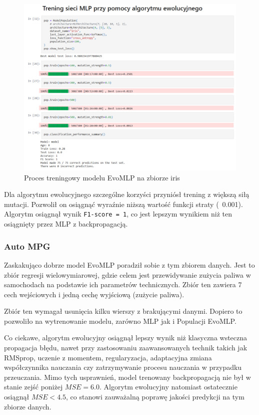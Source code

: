 \documentclass{article}
\begin{document}
\begin{figure}[H]
    \centering
    \includegraphics[width=\textwidth]{img/ae3/iris_training.png}
    \caption{Proces treningowy modelu EvoMLP na zbiorze iris}
\end{figure}

Dla algorytmu ewolucyjnego szczególne korzyści przyniósł trening z większą siłą mutacji. Pozwolił on osiągnąć wyraźnie niższą wartość funkcji straty (~0.001). Algorytm osiągnął wynik \texttt{F1-score = 1}, co jest lepszym wynikiem niż ten osiągnięty przez MLP z backpropagacją.

\subsubsection*{Auto MPG}

Zaskakująco dobrze model EvoMLP poradził sobie z tym zbiorem danych. Jest to zbiór regresji wielowymiarowej, gdzie celem jest przewidywanie zużycia paliwa w samochodach na podstawie ich parametrów technicznych. Zbiór ten zawiera 7 cech wejściowych i jedną cechę wyjściową (zużycie paliwa).

Zbiór ten wymagał usunięcia kilku wierszy z brakującymi danymi. Dopiero to pozwoliło na wytrenowanie modelu, zarówno MLP jak i Populacji EvoMLP. 

Co ciekawe, algorytm ewolucyjny osiągnął lepszy wynik niż klasyczna wsteczna propagacja błędu, nawet przy zastosowaniu zaawansowanych technik takich jak RMSprop, uczenie z momentem, regularyzacja, adaptacyjna zmiana współczynnika nauczania czy zatrzymywanie procesu nauczania w przypadku przeuczania. Mimo tych usprawnień, model trenowany backpropagacją nie był w stanie zejść poniżej $MSE = 6.0$. Algorytm ewolucyjny natomiast ostatecznie osiągnął $MSE < 4.5$, co stanowi zauważalną poprawę jakości predykcji na tym zbiorze danych.
\end{document}
